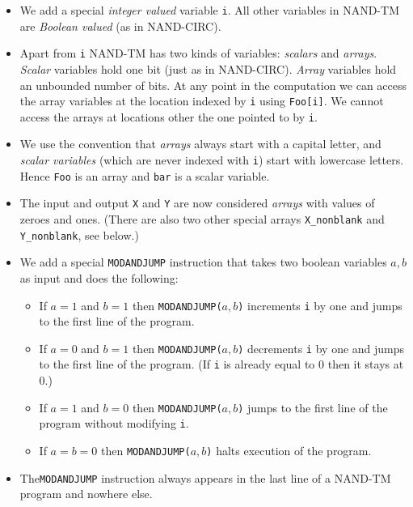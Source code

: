 \begin{itemize}
\item
  We add a special \emph{integer valued} variable \texttt{i}. All other
  variables in NAND-TM are \emph{Boolean valued} (as in NAND-CIRC).
\item
  Apart from \texttt{i} NAND-TM has two kinds of variables:
  \emph{scalars} and \emph{arrays}. \emph{Scalar} variables hold one bit
  (just as in NAND-CIRC). \emph{Array} variables hold an unbounded
  number of bits. At any point in the computation we can access the
  array variables at the location indexed by \texttt{i} using
  \texttt{Foo[i]}. We cannot access the arrays at locations other the
  one pointed to by \texttt{i}.
\item
  We use the convention that \emph{arrays} always start with a capital
  letter, and \emph{scalar variables} (which are never indexed with
  \texttt{i}) start with lowercase letters. Hence \texttt{Foo} is an
  array and \texttt{bar} is a scalar variable.
\item
  The input and output \texttt{X} and \texttt{Y} are now considered
  \emph{arrays} with values of zeroes and ones. (There are also two
  other special arrays \texttt{X\_nonblank} and \texttt{Y\_nonblank},
  see below.)
\item
  We add a special \texttt{MODANDJUMP} instruction that takes two
  boolean variables \(a,b\) as input and does the following:

  \begin{itemize}
  \tightlist
  \item
    If \(a=1\) and \(b=1\) then \texttt{MODANDJUMP(}\(a,b\)\texttt{)}
    increments \texttt{i} by one and jumps to the first line of the
    program.
  \item
    If \(a=0\) and \(b=1\) then \texttt{MODANDJUMP(}\(a,b\)\texttt{)}
    decrements \texttt{i} by one and jumps to the first line of the
    program. (If \texttt{i} is already equal to \(0\) then it stays at
    \(0\).)
  \item
    If \(a=1\) and \(b=0\) then \texttt{MODANDJUMP(}\(a,b\)\texttt{)}
    jumps to the first line of the program without modifying \texttt{i}.
  \item
    If \(a=b=0\) then \texttt{MODANDJUMP(}\(a,b\)\texttt{)} halts
    execution of the program.
  \end{itemize}
\item
  The\texttt{MODANDJUMP} instruction always appears in the last line of
  a NAND-TM program and nowhere else.
\end{itemize}

